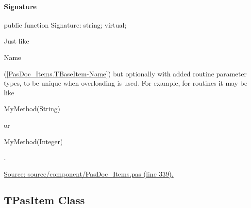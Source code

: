 \documentclass{report}
\newif\ifpdf
\begin{document}
\paragraph*{Signature}\hspace*{\fill}

\label{PasDoc_Items.TBaseItem-Signature}
\begin{list}{}{
\setlength{\itemindent}{0cm}
\setlength{\listparindent}{0cm}
\setlength{\leftmargin}{\evensidemargin}
\addtolength{\leftmargin}{\tmplength}
\settowidth{\labelsep}{X}
\addtolength{\leftmargin}{\labelsep}
\setlength{\labelwidth}{\tmplength}
}
\item[\textbf{Declaration}\hfill]
\ifpdf
\begin{flushleft}
\fi
\begin{ttfamily}
public function Signature: string; virtual;\end{ttfamily}

\ifpdf
\end{flushleft}
\fi

\par
\item[\textbf{Description}]
Just like \begin{ttfamily}Name\end{ttfamily}(\ref{PasDoc_Items.TBaseItem-Name}) but optionally with added routine parameter types, to be unique when overloading is used. For example, for routines it may be like \begin{ttfamily}MyMethod(String)\end{ttfamily} or \begin{ttfamily}MyMethod(Integer)\end{ttfamily}.\par
\href{https://github.com/pasdoc/pasdoc/blob/master/source/component/PasDoc_Items.pas#L339}{Source: source/component/PasDoc{\_}Items.pas (line 339).}

\end{list}
\ifpdf
\subsection*{\large{\textbf{TPasItem Class}}\normalsize\hspace{1ex}\hrulefill}
\else
\subsection*{TPasItem Class}
\fi
\label{PasDoc_Items.TPasItem}
\end{document}

